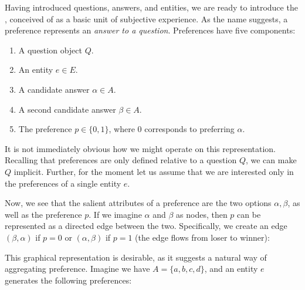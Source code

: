\bigskip

Having introduced questions, answers, and entities, we are ready to introduce the , conceived of as a basic unit of subjective experience. As the name suggests, a preference represents an \textit{answer to a question}. Preferences have five components:

\begin{enumerate}
	\item A question object $Q$.
	\item An entity $e \in E$.
	\item A candidate answer $\alpha \in A$.
	\item A second candidate answer $\beta \in A$.
	\item The preference $p \in \{0, 1\}$, where $0$ corresponds to preferring $\alpha$.
\end{enumerate}

It is not immediately obvious how we might operate on this representation. Recalling that preferences are only defined relative to a question $Q$, we can make $Q$ implicit. Further, for the moment let us assume that we are interested only in the preferences of a single entity $e$.

Now, we see that the salient attributes of a preference are the two options $\alpha, \beta$, as well as the preference $p$. If we imagine $\alpha$ and $\beta$ as nodes, then $p$ can be represented as a directed edge between the two. Specifically, we create an edge $(\beta, \alpha)$ if $p = 0$ or $(\alpha, \beta)$ if $p = 1$ (the edge flows from loser to winner):

\begin{center}
\end{center}

This graphical representation is desirable, as it suggests a natural way of aggregating preference. Imagine we have $A = \{a, b, c, d\}$, and an entity $e$ generates the following preferences:

\begin{center}


\end{center}

